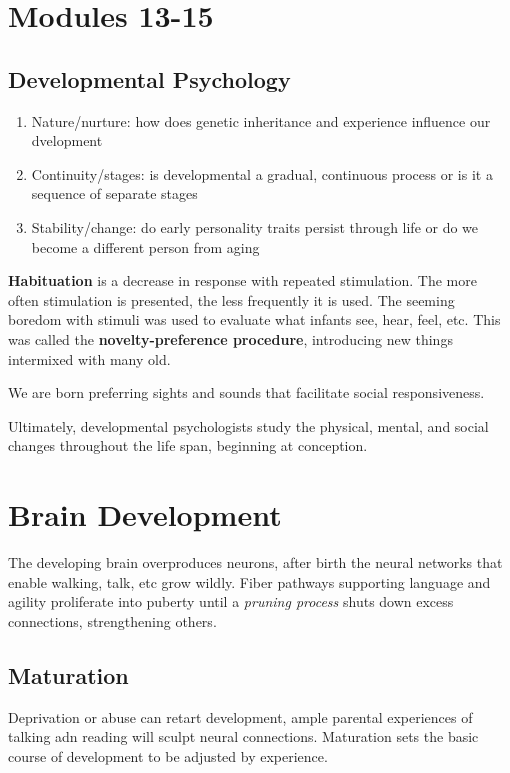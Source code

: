 \documentclass[12pt]{article}
\begin{document}
\section*{Modules 13-15}
\subsection*{Developmental Psychology}
\begin{enumerate}
\item Nature/nurture: how does genetic inheritance and experience influence our dvelopment
\item Continuity/stages: is developmental a gradual, continuous process or is it a sequence of separate stages
\item Stability/change: do early personality traits persist through life or do we become a different person from aging
\end{enumerate}

\textbf{Habituation} is a decrease in response with repeated stimulation. The more often stimulation is presented, the less frequently it is used. The seeming boredom with stimuli was used to evaluate what infants see, hear, feel, etc. This was called the \textbf{novelty-preference procedure}, introducing new things intermixed with many old.

We are born preferring sights and sounds that facilitate social responsiveness.

Ultimately, developmental psychologists study the physical, mental, and social changes throughout the life span, beginning at conception. 

\section*{Brain Development}

The developing brain overproduces neurons, after birth the neural networks that enable walking, talk, etc grow wildly. Fiber pathways supporting language and agility proliferate into puberty until a \textit{pruning process} shuts down excess connections, strengthening others. 

\subsection*{Maturation}
Deprivation or abuse can retart development, ample parental experiences of talking adn reading will sculpt neural connections. Maturation sets the basic course of development to be adjusted by experience.
\end{document}
